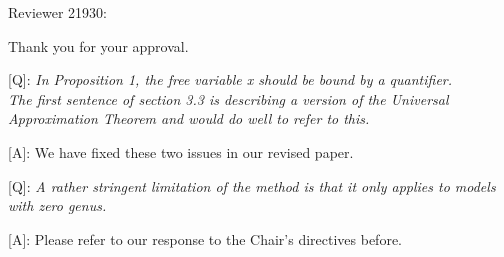 \documentclass[10pt]{letter} %
\begin{document}
	\hdashrule{\linewidth}{1pt}{1mm}
	Reviewer 21930:
	
	Thank you for your approval.
	
	[Q]: \emph{In Proposition 1, the free variable x should be bound by a quantifier.
		\\The first sentence of section 3.3 is describing a version of the Universal Approximation Theorem and would do well to refer to this.}
	
	[A]: We have fixed these two issues in our revised paper. 
	
	[Q]: \emph{A rather stringent limitation of the method is that it only applies to models with zero genus.}
	
	[A]: Please refer to our response to the Chair's directives before. 
\end{document}
